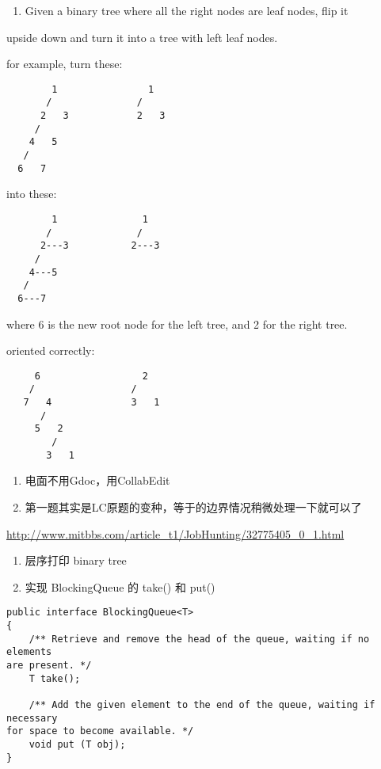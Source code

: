 \documentclass[12pt]{book}
\begin{document}
\begin{enumerate}
\item Given a binary tree where all the right nodes are leaf nodes, flip it
\end{enumerate}
upside down and turn it into a tree with left leaf nodes.

for example, turn these:
\lstset{language=java,label= ,caption= ,numbers=none}
\begin{lstlisting}
        1                1
       /               / 
      2   3            2   3
     / 
    4   5
   / 
  6   7
\end{lstlisting}

into these:
\lstset{language=java,label= ,caption= ,numbers=none}
\begin{lstlisting}
        1               1
       /               /
      2---3           2---3
     /
    4---5
   /
  6---7
\end{lstlisting}

where 6 is the new root node for the left tree, and 2 for the right tree.

oriented correctly:
\lstset{language=java,label= ,caption= ,numbers=none}
\begin{lstlisting}
     6                  2
    /                 / 
   7   4              3   1
      / 
     5   2
        / 
       3   1
\end{lstlisting}

\begin{enumerate}
\item 电面不用Gdoc，用CollabEdit

\item 第一题其实是LC原题的变种，等于的边界情况稍微处理一下就可以了
\end{enumerate}

\url{http://www.mitbbs.com/article_t1/JobHunting/32775405_0_1.html}

\begin{enumerate}
\item 层序打印 binary tree

\item 实现 BlockingQueue 的 take() 和 put()
\end{enumerate}
\lstset{language=java,label= ,caption= ,numbers=none}
\begin{lstlisting}
public interface BlockingQueue<T>
{
    /** Retrieve and remove the head of the queue, waiting if no elements 
are present. */
    T take();

    /** Add the given element to the end of the queue, waiting if necessary 
for space to become available. */
    void put (T obj);
}
\end{lstlisting}
\end{document}
